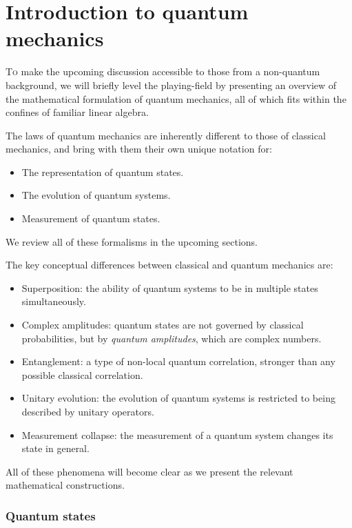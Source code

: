 \documentclass[aps,pra,twocolumn,amsmath,amssymb,nofootinbib,superscriptaddress]{revtex4}
\newcommand{\dropcap}[2]{\lettrine[lines=2, findent=3pt, nindent=0pt]{#1}{#2}}
\begin{document}
%
%

\part{Introduction to quantum mechanics}

\dropcap{T}{o} make the upcoming discussion accessible to those from a non-quantum background, we will briefly level the playing-field by presenting an overview of the mathematical formulation of quantum mechanics, all of which fits within the confines of familiar linear algebra.

The laws of quantum mechanics are inherently different to those of classical mechanics, and bring with them their own unique notation for:
\begin{itemize}
	\item The representation of quantum states.
	\item The evolution of quantum systems.
	\item Measurement of quantum states.
\end{itemize}
We review all of these formalisms in the upcoming sections.

The key conceptual differences between classical and quantum mechanics are:
\begin{itemize}
	\item Superposition: the ability of quantum systems to be in multiple states simultaneously.
	\item Complex amplitudes: quantum states are not governed by classical probabilities, but by \textit{quantum amplitudes}, which are complex numbers.
	\item Entanglement: a type of non-local quantum correlation, stronger than any possible classical correlation.
	\item Unitary evolution: the evolution of quantum systems is restricted to being described by unitary operators.
	\item Measurement collapse: the measurement of a quantum system changes its state in general.	
\end{itemize}
All of these phenomena will become clear as we present the relevant mathematical constructions.

%
%

\section{Quantum states}
\end{document}
